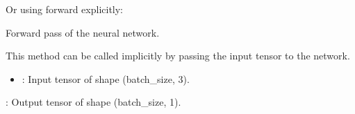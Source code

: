 \documentclass[letterpaper,10pt,english]{sphinxmanual}
\begin{document}
\begin{fulllineitems}
\begin{description}
\begin{sphinxVerbatim}[commandchars=\\\{\}]
  
    
  
\end{sphinxVerbatim}

\sphinxAtStartPar
Or using forward explicitly:

\begin{sphinxVerbatim}[commandchars=\\\{\}]
  
\end{sphinxVerbatim}

\end{description}

\begin{fulllineitems}
\label{\detokenize{ExtinctionNetwork:ExtinctionNetwork.ExtinctionNetwork.forward}}
\pysigstartsignatures
{}
\pysigstopsignatures
\sphinxAtStartPar
Forward pass of the neural network.
\begin{description}
\sphinxAtStartPar
This method can be called implicitly by passing the input tensor to the network.

\begin{itemize}
\item {} 
\sphinxAtStartPar
{}: Input tensor of shape (batch\_size, 3).

\end{itemize}

\sphinxAtStartPar
{}: Output tensor of shape (batch\_size, 1).

\end{description}

\end{fulllineitems}


\end{fulllineitems}
\end{document}
